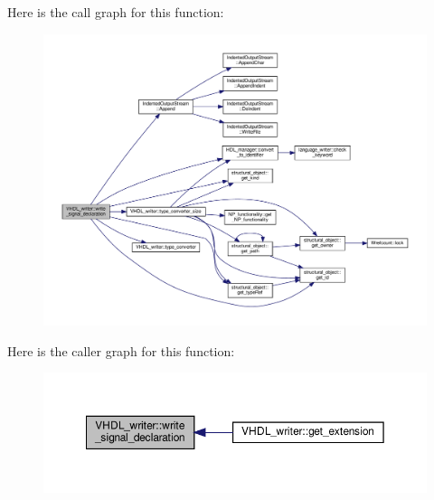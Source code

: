 Here is the call graph for this function\+:
\nopagebreak
\begin{figure}[H]
\begin{center}
\leavevmode
\includegraphics[width=350pt]{d0/d0c/structVHDL__writer_abbe0d08a850b90049d20cbc3ded0e132_cgraph}
\end{center}
\end{figure}
Here is the caller graph for this function\+:
\nopagebreak
\begin{figure}[H]
\begin{center}
\leavevmode
\includegraphics[width=350pt]{d0/d0c/structVHDL__writer_abbe0d08a850b90049d20cbc3ded0e132_icgraph}
\end{center}
\end{figure}
\mbox{\label{structVHDL__writer_a0c98259dd9ea0a8ac551a7204e3a734f}} 

